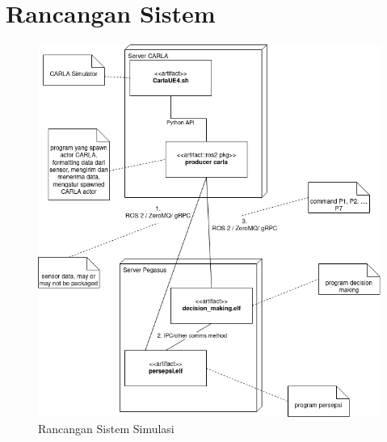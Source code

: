 \chapter{Rancangan Sistem}\label{appendix-arsitektur-baru}
\setcounter{section}{1}
\begin{figure}[ht]
	\centering
	\includegraphics[width=1.0\textwidth]{resources/appendix-1-deployment diagram.png}
	\caption{Rancangan Sistem Simulasi}
\end{figure}